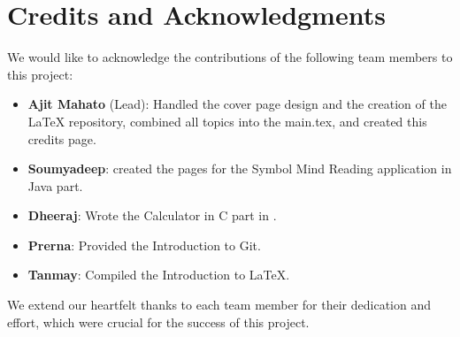 \section*{Credits and Acknowledgments}

We would like to acknowledge the contributions of the following team members to this project:

\begin{itemize}
    \item \textbf{Ajit Mahato} (Lead): Handled the cover page design and the creation of the LaTeX repository, combined all topics into the main.tex, and created this credits page.
    \item \textbf{Soumyadeep}: created the pages for the Symbol Mind Reading application in Java part.
    \item \textbf{Dheeraj}: Wrote the Calculator in C part in .
    \item \textbf{Prerna}: Provided the Introduction to Git.
    \item \textbf{Tanmay}: Compiled the Introduction to LaTeX.
\end{itemize}

We extend our heartfelt thanks to each team member for their dedication and effort, which were crucial for the success of this project.
